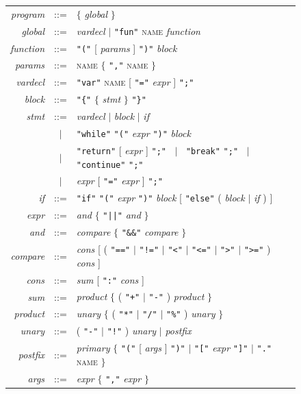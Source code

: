 \documentclass[11pt,a4paper]{article}
\newcommand{\nt}[1]{\textit{#1}}
\newcommand{\tok}[1]{\texttt{"#1"}}
\begin{document}
\begin{figure}[t]
\centering
\renewcommand{\arraystretch}{1.15}
\begin{tabular}{@{}r@{\quad}c@{\quad}l@{}}
\nt{program}  & ::= & $\{$ \nt{global} $\}$\\
\nt{global}   & ::= & \nt{vardecl} $\mid$ \tok{fun} \textsc{name} \nt{function}\\
\nt{function} & ::= & \tok{(} [ \nt{params} ] \tok{)} \nt{block}\\
\nt{params}   & ::= & \textsc{name} $\{$ \tok{,} \textsc{name} $\}$\\
\nt{vardecl}  & ::= & \tok{var} \textsc{name} [ \tok{=} \nt{expr} ] \tok{;}\\[5pt]
\nt{block}    & ::= & \tok{\{} $\{$ \nt{stmt} $\}$ \tok{\}}\\
\nt{stmt}     & ::= & \nt{vardecl} $\mid$ \nt{block} $\mid$ \nt{if}\\
              & $\mid$ & \tok{while} \tok{(} \nt{expr} \tok{)} \nt{block}\\
              & $\mid$ & \tok{return} [ \nt{expr} ] \tok{;}
                $\;\mid\;$ \tok{break} \tok{;} $\;\mid\;$ \tok{continue} \tok{;}\\
              & $\mid$ & \nt{expr} [ \tok{=} \nt{expr} ] \tok{;}\\
\nt{if}       & ::= & \tok{if} \tok{(} \nt{expr} \tok{)} \nt{block} [ \tok{else} ( \nt{block} $\mid$ \nt{if} ) ]\\[5pt]
\nt{expr}     & ::= & \nt{and} $\{$ \tok{||} \nt{and} $\}$\\
\nt{and}      & ::= & \nt{compare} $\{$ \tok{\&\&} \nt{compare} $\}$\\
\nt{compare}  & ::= & \nt{cons} [ ( \tok{==} $\mid$ \tok{!=} $\mid$ \tok{<} $\mid$ \tok{<=} $\mid$ \tok{>} $\mid$ \tok{>=} ) \nt{cons} ]\\
\nt{cons}     & ::= & \nt{sum} [ \tok{:} \nt{cons} ]\\
\nt{sum}      & ::= & \nt{product} $\{$ ( \tok{+} $\mid$ \tok{-} ) \nt{product} $\}$\\
\nt{product}  & ::= & \nt{unary} $\{$ ( \tok{*} $\mid$ \tok{/} $\mid$ \tok{\%} ) \nt{unary} $\}$\\
\nt{unary}    & ::= & ( \tok{-} $\mid$ \tok{!} ) \nt{unary} $\mid$ \nt{postfix}\\
\nt{postfix}  & ::= & \nt{primary} $\{$ \tok{(} [ \nt{args} ] \tok{)} $\mid$ \tok{[} \nt{expr} \tok{]} $\mid$ \tok{.} \textsc{name} $\}$\\
\nt{args}     & ::= & \nt{expr} $\{$ \tok{,} \nt{expr} $\}$\\

\end{tabular}
\end{figure}
\end{document}
